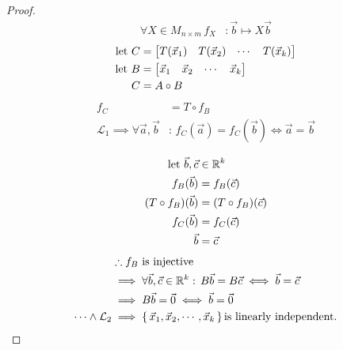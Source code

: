 \begin{proof}

	\begin{align*}
		\forall X \in M_{n \times m}\, f_X & : \vec b \mapsto X \vec b
	\end{align*}
	\begin{align*}
		{\text{let } } C & = { \begin{bmatrix}  T(\vec x_1) & T(\vec x_2) & \cdots & T(\vec x_k)  \end{bmatrix} } \\
		{\text{let } } B & = { \begin{bmatrix}  \vec x_1    & \vec x_2    & \cdots & \vec x_k  \end{bmatrix} }    \\
		C       & = A \circ B
	\end{align*}
	\begin{align*}
		f_C                                             & = T \circ f_B                                     \\
		\mathcal L_{1} \implies		\forall \vec a, \vec b & :\, f_C(\vec a) = f_C(\vec b) \iff  \vec a=\vec b
	\end{align*}

	\begin{align*}
		{\text{let } } \vec b, \vec c   & \in {\mathbb R}^{k}              \\
		f_B (\vec b)           & = f_B(\vec c)           \\
		(T \circ	f_B) (\vec b) & = (T \circ f_B)(\vec c) \\
		f_C (\vec b)           & = f_C(\vec c)           \\
		\vec b                 & = \vec c
	\end{align*}
	\begin{align*}
		                          & \therefore                 f_B \text{ is injective}                                   \\
		                          & \implies \forall \vec b, \vec c \in {\mathbb R}^{k} :\, B\vec b = B\vec c \iff \vec b = \vec c \\
		                          & \implies B\vec b = \vec 0 \iff \vec b = \vec 0                                        \\
		\dots \wedge	\mathcal L_2 & \implies \set{\vec x_1, \vec x_2 , \cdots , \vec x_k} \text{is linearly independent.}
	\end{align*}

\end{proof}
